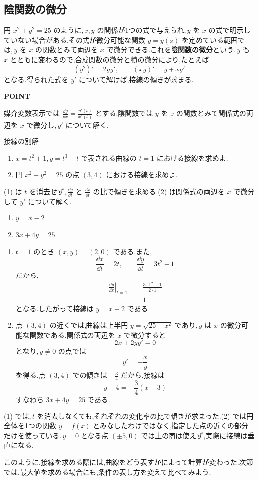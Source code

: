 \subsection{陰関数の微分}
円 $x^2+y^2=25$ のように,\,$x,y$ の関係が1つの式で与えられ,\,$y$ を $x$ の式で明示していない場合がある.その式が微分可能な関数 $y=y(x)$ を定めている範囲では,\,$y$ を $x$ の関数とみて両辺を $x$ で微分できる.これを\textbf{陰関数の微分}という.\,$y$ も $x$ とともに変わるので,合成関数の微分と積の微分により,たとえば
\[
 (y^2)'=2yy',\qquad (xy)'=y+xy'
\]
となる.得られた式を $y'$ について解けば,接線の傾きが求まる.

\begin{bookpoint}
\textbf{POINT}\par
媒介変数表示では $\frac{\dd y}{\dd x}=\frac{y'(t)}{x'(t)}$ とする.陰関数では $y$ を $x$ の関数とみて関係式の両辺を $x$ で微分し,\,$y'$ について解く.
\end{bookpoint}

\begin{example}{接線の別解}
\begin{enumerate}[label=(\arabic*),leftmargin=*]
 \item $x=t^2+1$,\,$y=t^3-t$ で表される曲線の $t=1$ における接線を求めよ.
 \item 円 $x^2+y^2=25$ の点 $(3,4)$ における接線を求めよ.
\end{enumerate}
\end{example}
(1) は $t$ を消去せず,\,$\frac{\dd y}{\dd t}$ と $\frac{\dd x}{\dd t}$ の比で傾きを求める.(2) は関係式の両辺を $x$ で微分して $y'$ について解く.

\begin{enumerate}[label=(\arabic*),leftmargin=*]
 \item $y=x-2$
 \item $3x+4y=25$
\end{enumerate}

\begin{enumerate}[label=(\arabic*),leftmargin=*]
 \item $t=1$ のとき $(x,y)=(2,0)$ である.また,
 \[
  \frac{\dd x}{\dd t}=2t,\qquad
  \frac{\dd y}{\dd t}=3t^2-1
 \]
 だから,
 \begin{align*}
  \left.\frac{\dd y}{\dd x}\right|_{t=1}
  &=\frac{3\cdot1^2-1}{2\cdot1}\\
  &=1
 \end{align*}
 となる.したがって接線は $y=x-2$ である.
 \item 点 $(3,4)$ の近くでは,曲線は上半円 $y=\sqrt{25-x^2}$ であり,\,$y$ は $x$ の微分可能な関数である.関係式の両辺を $x$ で微分すると
 \[
  2x+2yy'=0
 \]
 となり,\,$y\ne0$ の点では
 \[
  y'=-\frac xy
 \]
 を得る.点 $(3,4)$ での傾きは $-\frac34$ だから,接線は
 \[
  y-4=-\frac34(x-3)
 \]
 すなわち $3x+4y=25$ である.
\end{enumerate}

(1) では,\,$t$ を消去しなくても,それぞれの変化率の比で傾きが求まった.(2) では円全体を1つの関数 $y=f(x)$ とみなしたわけではなく,指定した点の近くの部分だけを使っている.\,$y=0$ となる点 $(\pm5,0)$ では上の商は使えず,実際に接線は垂直になる.

このように,接線を求める際には,曲線をどう表すかによって計算が変わった.次節では,最大値を求める場合にも,条件の表し方を変えて比べてみよう.
